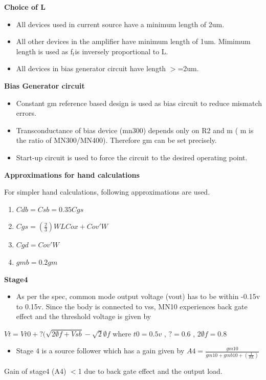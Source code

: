 \documentclass[12pt,a4paper]{article}
\begin{document}
\textbf{Choice of L}

\begin{itemize}
\item All devices used in current source have a minimum length of 2um.
\item All other devices in the amplifier have minimum length of 1um. 
Mimimum length is used as f$_{t }$is inversely proportional to L.
\item All devices in bias generator circuit have length $>$=2um.
\end{itemize}


\textbf{Bias Generator circuit}

\begin{itemize}
\item Constant gm reference based design is used as bias circuit to 
reduce mismatch errors.
\item Transconductance of bias device (mn300) depends only on R2 and m ( 
m is the ratio of MN300/MN400). Therefore gm can be set precisely.
\item Start-up circuit is used to force the circuit to the desired 
operating point.
\end{itemize}


\textbf{Approximations for hand calculations}

For simpler hand calculations, following approximations are used.

\begin{enumerate}
\item $Cdb=Csb=0.35 Cgs$
\item $Cgs=(\frac{2}{3})WLCox+Cov'W$
\item $Cgd=Cov'W$
\item $gmb=0.2gm$
\setcounter{numberedCntBB}{\theenumi}
\end{enumerate}
\textbf{Stage4}

\begin{itemize}
\item As per the spec, common mode output voltage (vout) has to be 
within -0.15v to 0.15v. Since the body is connected to vss, MN10 
experiences back gate effect and the threshold voltage is given by
\end{itemize}
$Vt=Vt0+ ?(\sqrt{2\emptyset f+Vsb}- \sqrt{2}\emptyset f$ where $
t0=0.5v$ , $?=0.6$ , $2\emptyset f=0.8$



\begin{itemize}
\item Stage 4 is a source follower which has a gain given by $
A4=\frac{gm10}{gm10+gmb10+(\frac{1}{RL})}$
\end{itemize}
Gain of stage4 (A4) $<$1 due to back gate effect and the output load. 
\end{document}
